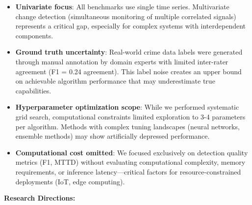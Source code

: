 \begin{itemize}
    \item \textbf{Univariate focus}: All benchmarks use single time series. Multivariate change detection (simultaneous monitoring of multiple correlated signals) represents a critical gap, especially for complex systems with interdependent components.
    
    \item \textbf{Ground truth uncertainty}: Real-world crime data labels were generated through manual annotation by domain experts with limited inter-rater agreement (F1 = 0.24 agreement). This label noise creates an upper bound on achievable algorithm performance that may underestimate true capabilities.
    
    \item \textbf{Hyperparameter optimization scope}: While we performed systematic grid search, computational constraints limited exploration to 3-4 parameters per algorithm. Methods with complex tuning landscapes (neural networks, ensemble methods) may show artificially depressed performance.
    
    \item \textbf{Computational cost omitted}: We focused exclusively on detection quality metrics (F1, MTTD) without evaluating computational complexity, memory requirements, or inference latency—critical factors for resource-constrained deployments (IoT, edge computing).
\end{itemize}

\textbf{Research Directions:}

